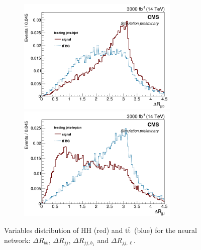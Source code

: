 \documentclass[10pt,a4paper]{article}
\newcommand{\ww}{7.7cm} %
\newcommand{\dd}{-2mm} %
\renewcommand{\tt}{$\text{t}\bar{\text{t}}$}
\begin{document}
\begin{figure}[h]
  \begin{subfigure}[b]{17cm}
    \begin{minipage}[h!]{\ww}
      \centering
      \includegraphics[width=\ww]{figs/DeltaR_jjb.png}
    \end{minipage}
    \begin{minipage}[h!]{\ww}
      \centering
      \includegraphics[width=\ww]{figs/DeltaR_jjl.png}
    \end{minipage}
  \end{subfigure}	
  \vspace{\dd} 
  \caption{Variables distribution of HH (red) and \tt\ (blue) for the neural network: $\Delta R_{bb}$, $\Delta R_{jj}$, $\Delta R_{jj,b_1}$ and $\Delta R_{jj,\ell}$.} \label{vars6}

\end{figure}
\end{document}
